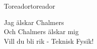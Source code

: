 \begin{song}{Toreador}{toreador}
\begin{vers}
Jag älskar Chalmers\\
Och Chalmers älskar mig\\
Vill du bli rik - Teknisk Fysik!\\
\end{vers}
\end{song}
